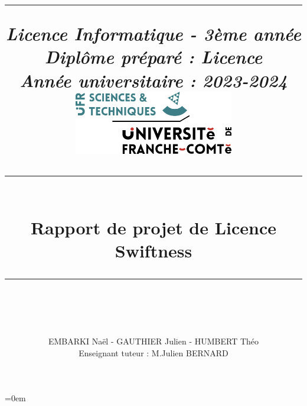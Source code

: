 



\parindent=0em
\pagestyle{fancy}

\renewcommand{\headrulewidth}{0pt}

\fancyhead[L]{}   %


\title{\vspace{50 mm}\rule{\linewidth}{.5pt} \textit{Licence Informatique - 3ème année \\Diplôme préparé : Licence \\Année universitaire : 2023-2024}\\
\vspace{15mm}\includegraphics[width = 70mm]{images/logo_st.png}
\vspace{15mm}\\\rule{\linewidth}{.3pt}\\\textbf{Rapport de projet de Licence \\Swiftness}
\\\rule{\linewidth}{.3pt}\\ \vspace{5 mm}}


\author{\vspace{3mm}\Large{EMBARKI Naël - GAUTHIER Julien - HUMBERT Théo}\\ Enseignant tuteur : M.Julien BERNARD}






